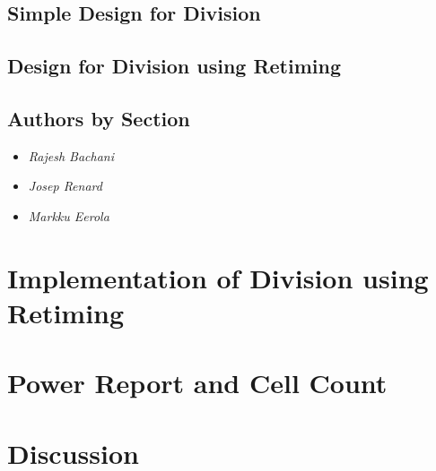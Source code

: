 \documentclass[11pt,a4paper]{article}
\begin{document}
\subsection{Simple Design for Division}
\subsection{Design for Division using Retiming}
\subsection{Authors by Section}
\begin{itemize}
\item \textit{Rajesh Bachani} 
\item \textit{Josep Renard} 
\item \textit{Markku Eerola} 
\end{itemize}

\section{Implementation of Division using Retiming}
\label{section:impl}
\section{Power Report and Cell Count}
\label{section:power}
\section{Discussion}
\label{section:discussion}
\end{document}
